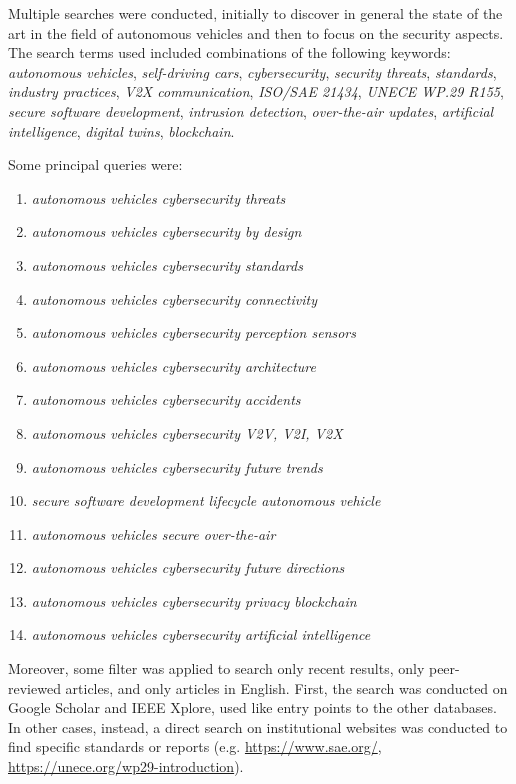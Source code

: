 Multiple searches were conducted, initially to discover in general the state of the art in the field of autonomous vehicles and then to focus on the security aspects.
The search terms used included combinations of the following keywords:
\textit{autonomous vehicles},
\textit{self-driving cars},
\textit{cybersecurity},
\textit{security threats},
\textit{standards},
\textit{industry practices},
\textit{V2X communication},
\textit{ISO/SAE 21434},
\textit{UNECE WP.29 R155},
\textit{secure software development},
\textit{intrusion detection},
\textit{over-the-air updates},
\textit{artificial intelligence},
\textit{digital twins},
\textit{blockchain}.

Some principal queries were:
\begin{enumerate}
    \item \textit{autonomous vehicles cybersecurity threats}
    \item \textit{autonomous vehicles cybersecurity by design}
    \item \textit{autonomous vehicles cybersecurity standards}
    \item \textit{autonomous vehicles cybersecurity connectivity}
    \item \textit{autonomous vehicles cybersecurity perception sensors}
    \item \textit{autonomous vehicles cybersecurity architecture}
    \item \textit{autonomous vehicles cybersecurity accidents}
    \item \textit{autonomous vehicles cybersecurity V2V, V2I, V2X}
    \item \textit{autonomous vehicles cybersecurity future trends}
    \item \textit{secure software development lifecycle autonomous vehicle}
    \item \textit{autonomous vehicles secure over-the-air}
    \item \textit{autonomous vehicles cybersecurity future directions}
    \item \textit{autonomous vehicles cybersecurity privacy blockchain}
    \item \textit{autonomous vehicles cybersecurity artificial intelligence}
\end{enumerate}

Moreover, some filter was applied to search only recent results, only peer-reviewed articles, and only articles in English.
First, the search was conducted on Google Scholar and IEEE Xplore, used like entry points to the other databases.
In other cases, instead, a direct search on institutional websites was conducted to find specific standards or reports (e.g. \url{https://www.sae.org/}, \url{https://unece.org/wp29-introduction}).

